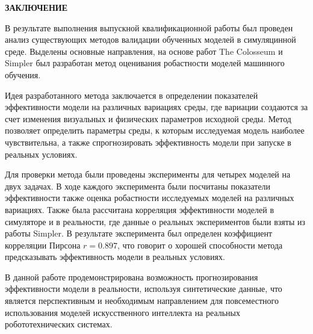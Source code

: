 \newpage
\begin{center}
  \textbf{\large ЗАКЛЮЧЕНИЕ}
\end{center}

В результате выполнения выпускной квалификационной работы был проведен анализ существующих методов валидации обученных моделей в симуляцинной среде. Выделены основные направления, на основе работ The Colosseum и Simpler был разработан метод оценивания робастности моделей машинного обучения. 

Идея разработанного метода заключается в определении показателей эффективности модели на различных вариациях среды, где вариации создаются за счет изменения визуальных и физических параметров исходной среды. Метод позволяет определить параметры среды, к которым исследуемая модель наиболее чувствительна, а также спрогнозировать эффективность модели при запуске в реальных условиях.  

Для проверки метода были проведены эксперименты для четырех моделей на двух задачах. В ходе каждого эксперимента были посчитаны показатели эффективности также оценка робастности исследуемых моделей на различных вариациях. Также была рассчитана корреляция эффективности моделей в симуляторе и в реальности, где данные о реальных экспериментов были взяты из работы Simpler. В результате эксперимента был определен коэффициент корреляции Пирсона $r = 0.897$, что говорит о хорошей способности метода предсказывать эффективность модели в реальных условиях. 

В данной работе продемонстрирована возможность прогнозирования эффективности модели в реальности, используя синтетические данные, что является перспективным и необходимым направлением для повсеместного использования моделей искусственного интеллекта на реальных робототехнических системах.

